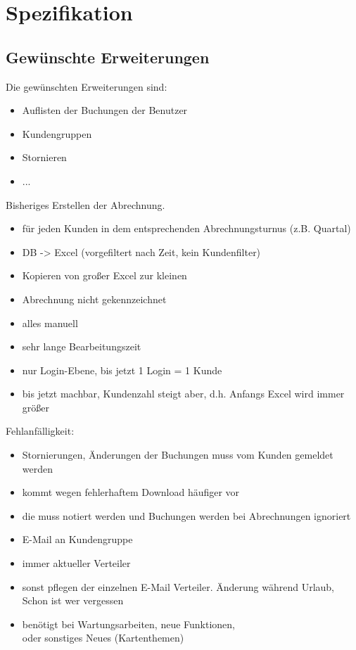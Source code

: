 \chapter{Spezifikation}
\section{Gewünschte Erweiterungen}
Die gewünschten Erweiterungen sind:
\begin{itemize}
	\item Auflisten der Buchungen der Benutzer
	\item Kundengruppen
	\item Stornieren
	\item ...
\end{itemize}

Bisheriges Erstellen der Abrechnung.
\begin{itemize}
	\item für jeden Kunden in dem entsprechenden Abrechnungsturnus (z.B. Quartal)
	\item DB -> Excel (vorgefiltert nach Zeit, kein Kundenfilter)
	\item Kopieren von großer Excel zur kleinen
	\item Abrechnung nicht gekennzeichnet
	\item alles manuell
	\item sehr lange Bearbeitungszeit
	\item nur Login-Ebene, bis jetzt 1 Login = 1 Kunde
	\item bis jetzt machbar, Kundenzahl steigt aber, d.h. Anfangs Excel wird immer größer
\end{itemize}

Fehlanfälligkeit:
\begin{itemize}
	\item Stornierungen, Änderungen der Buchungen muss vom Kunden gemeldet werden
	\item kommt wegen fehlerhaftem Download häufiger vor
	\item die muss notiert werden und Buchungen werden bei Abrechnungen ignoriert
\end{itemize}

\begin{itemize}
	\item E-Mail an Kundengruppe
	\item immer aktueller Verteiler
	\item sonst pflegen der einzelnen E-Mail Verteiler. Änderung während Urlaub, Schon ist wer vergessen
	\item benötigt bei Wartungsarbeiten, neue Funktionen,\\ oder sonstiges Neues (Kartenthemen)
\end{itemize}

